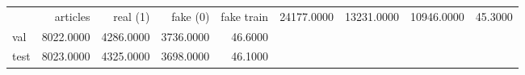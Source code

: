 \begin{tabular}{lrrrr}
\toprule
 & articles & real (1) & fake (0) & fake %
\midrule
train & 24177.0000 & 13231.0000 & 10946.0000 & 45.3000 \\
val & 8022.0000 & 4286.0000 & 3736.0000 & 46.6000 \\
test & 8023.0000 & 4325.0000 & 3698.0000 & 46.1000 \\
\bottomrule
\end{tabular}
